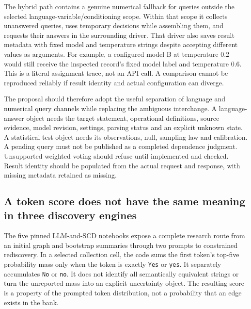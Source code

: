 The hybrid path contains a genuine numerical fallback for queries
outside the selected language-variable/conditioning scope. Within that
scope it collects unanswered queries, uses temporary decisions while
assembling them, and requests their answers in the surrounding driver.
That driver also saves result metadata with fixed model and temperature
strings despite accepting different values as arguments. For example, a
configured model B at temperature 0.2 would still receive the inspected
record's fixed model label and temperature 0.6. This is a literal
assignment trace, not an API call. A comparison cannot be reproduced
reliably if result identity and actual configuration can diverge.
\citep{exec14_iid_gpt}

The proposal should therefore adopt the useful separation of language
and numerical query channels while replacing the ambiguous interchange.
A language-answer object needs the target statement, operational
definitions, source evidence, model revision, settings, parsing status
and an explicit unknown state. A statistical test object needs its
observations, null, sampling law and calibration. A pending query must
not be published as a completed dependence judgment. Unsupported
weighted voting should refuse until implemented and checked. Result
identity should be populated from the actual request and response, with
missing metadata retained as missing.

\hypertarget{a-token-score-does-not-have-the-same-meaning-in-three-discovery-engines}{%
\subsection{A token score does not have the same meaning in three
discovery
engines}\label{a-token-score-does-not-have-the-same-meaning-in-three-discovery-engines}}

The five pinned LLM-and-SCD notebooks expose a complete research route
from an initial graph and bootstrap summaries through two prompts to
constrained rediscovery. In a selected collection cell, the code sums
the first token's top-five probability mass only when the token is
exactly \texttt{Yes} or \texttt{yes}. It separately accumulates
\texttt{No} or \texttt{no}. It does not identify all semantically
equivalent strings or turn the unreported mass into an explicit
uncertainty object. The resulting score is a property of the prompted
token distribution, not a probability that an edge exists in the bank.
\citep{exec14_iid_scd}

